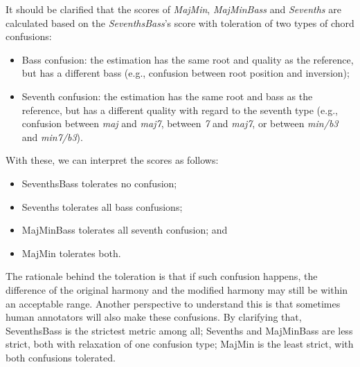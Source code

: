 It should be clarified that the scores of \textit{MajMin}, \textit{MajMinBass} and \textit{Sevenths} are calculated based on the \textit{SeventhsBass}'s score with toleration of two types of chord confusions:
\begin{itemize}
	\item Bass confusion: the estimation has the same root and quality as the reference, but has a different bass (e.g., confusion between root position and inversion);
	\item Seventh confusion: the estimation has the same root and bass as the reference, but has a different quality with regard to the seventh type (e.g., confusion between \textit{maj} and \textit{maj7}, between \textit{7} and \textit{maj7}, or between \textit{min/b3} and \textit{min7/b3}).
\end{itemize}
With these, we can interpret the scores as follows:
\begin{itemize}
	\item SeventhsBass tolerates no confusion;
	\item Sevenths tolerates all bass confusions;
	\item MajMinBass tolerates all seventh confusion; and
	\item MajMin tolerates both.
\end{itemize}
The rationale behind the toleration is that if such confusion happens, the difference of the original harmony and the modified harmony may still be within an acceptable range. Another perspective to understand this is that sometimes human annotators will also make these confusions. By clarifying that, SeventhsBass is the strictest metric among all; Sevenths and MajMinBass are less strict, both with relaxation of one confusion type; MajMin is the least strict, with both confusions tolerated.

